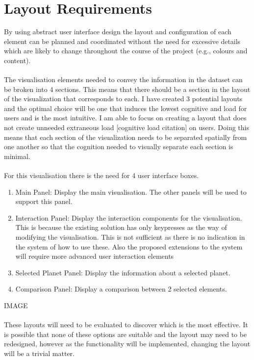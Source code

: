 \documentclass[11pt
              , a4paper
              , twoside
              , openright
              ]{report}
\begin{document}
\section{Layout Requirements}
By using abstract user interface design the layout and configuration of each element can be planned and coordinated without the need for excessive details which are likely to change throughout the course of the project (e.g., colours and content).
\\\\
The visualisation elements needed to convey the information in the dataset can be broken into 4 sections. This means that there should be a section in the layout of the visualization that corresponds to each. I have created 3 potential layouts and the optimal choice will be one that induces the lowest cognitive and load for users and is the most intuitive.  I am able to focus on creating a layout that does not create unneeded extraneous load [cognitive load citation] on users. Doing this means that each section of the visualization needs to be separated spatially from one another so that the cognition needed to visually separate each section is minimal.  
\\\\
For this visualisation there is the need for 4 user interface boxes. 
\begin{enumerate}
\item Main Panel: Display the main visualisation. The other panels will be used to support this panel.
 \item Interaction Panel: Display the interaction components for the visualisation. This is because the existing solution has only keypresses as the way of modifying the visualisation. This is not sufficient as there is no indication in the system of how to use these. Also the proposed extensions to the system will require more advanced user interaction elements
\item Selected Planet Panel: Display the information about a selected planet.
\item Comparison Panel: Display a comparison between 2 selected elements.
\end{enumerate}
IMAGE
\\\\
These layouts will need to be evaluated to discover which is the most effective. It is possible that none of these options are suitable and the layout may need to be redesigned, however as the functionality will be implemented, changing the layout will be a trivial matter. 
\end{document}
